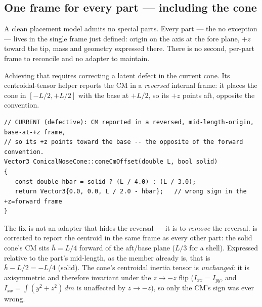 
\subsection{One frame for every part --- including the cone}\label{sec:philosophy-oneframe}

A clean placement model admits no special parts. Every part --- the  no
exception --- lives in the single frame just defined: origin on the axis at the fore plane, $+z$
toward the tip, mass and geometry expressed there. There is no second, per-part frame to
reconcile and no adapter to maintain.

Achieving that requires correcting a latent defect in the current cone. Its centroidal-tensor
helper reports the CM in a \emph{reversed} internal frame: it places the cone in $[-L/2,+L/2]$
with the base at $+L/2$, so its $+z$ points aft, opposite the convention.

\begin{listing}[htbp]
\begin{verbatim}
// CURRENT (defective): CM reported in a reversed, mid-length-origin, base-at-+z frame,
// so its +z points toward the base -- the opposite of the forward convention.
Vector3 ConicalNoseCone::coneCmOffset(double L, bool solid)
{
   const double hbar = solid ? (L / 4.0) : (L / 3.0);
   return Vector3{0.0, 0.0, L / 2.0 - hbar};   // wrong sign in the +z=forward frame
}
\end{verbatim}
\caption{The pre-existing reversed cone frame ().
This is an implementation mistake, not a design choice: it is the only place in the codebase
whose $+z$ disagrees with the forward convention.}\label{lst:conecmoffset}
\end{listing}

The fix is not an adapter that hides the reversal --- it is to \emph{remove} the reversal.
 is corrected to report the centroid in the same \zfwd{} frame as every other
part: the solid cone's CM sits $\bar{h} = L/4$ forward of the aft/base plane ($L/3$ for a shell).
Expressed relative to the part's mid-length, as the  member already is, that is
$\bar{h} - L/2 = -L/4$ (solid). The cone's centroidal inertia tensor is \emph{unchanged}: it is
axisymmetric and therefore invariant under the $z \to -z$ flip ($I_{xx}=I_{yy}$, and $I_{xx} =
\int (y^2+z^2)\,dm$ is unaffected by $z \to -z$), so only the CM's sign was ever wrong.


